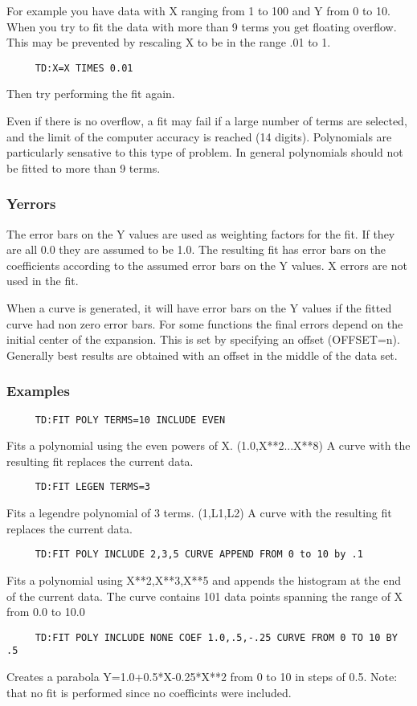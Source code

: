 For  example you have data with X ranging from 1 to 100 and Y from 0 to
10.  When you try to fit the data  with  more  than  9  terms  you  get
floating  overflow.   This may be prevented by rescaling X to be in the
range .01 to 1.  
\begin{verbatim}
     TD:X=X TIMES 0.01 
\end{verbatim}
Then try performing the fit again.  

Even if there is no overflow, a fit may fail if a large number of terms
are selected, and the limit of the computer  accuracy  is  reached  (14
digits).   Polynomials  are  particularly  sensative  to  this  type of
problem.  In general polynomials should not be fitted to  more  than  9
terms.  
\subsubsection{Yerrors     }
The  error  bars  on the Y values are used as weighting factors for the
fit.  If they are all 0.0 they are assumed to be  1.0.   The  resulting
fit  has  error bars on the coefficients according to the assumed error
bars on the Y values.  X errors are not used in the fit.  

When  a  curve is generated, it will have error bars on the Y values if
the fitted curve had non zero error bars.  For some functions the final
errors  depend  on the initial center of the expansion.  This is set by
specifying an offset (OFFSET=n).  Generally best results  are  obtained
with an offset in the middle of the data set.  
\subsubsection{Examples    }
\begin{verbatim}
     TD:FIT POLY TERMS=10 INCLUDE EVEN 
\end{verbatim}
Fits  a  polynomial  using  the  even powers of X.  (1.0,X**2...X**8) A
curve with the resulting fit replaces the current data.  
\begin{verbatim}
     TD:FIT LEGEN TERMS=3 
\end{verbatim}
Fits  a  legendre  polynomial  of  3 terms.  (1,L1,L2) A curve with the
resulting fit replaces the current data.  
\begin{verbatim}
     TD:FIT POLY INCLUDE 2,3,5 CURVE APPEND FROM 0 to 10 by .1 
\end{verbatim}
Fits a polynomial using X**2,X**3,X**5 and appends the histogram at the
end of the current data.  The curve contains 101 data  points  spanning
the range of X from 0.0 to 10.0 
\begin{verbatim}
     TD:FIT POLY INCLUDE NONE COEF 1.0,.5,-.25 CURVE FROM 0 TO 10 BY .5 
\end{verbatim}
Creates  a parabola Y=1.0+0.5*X-0.25*X**2 from 0 to 10 in steps of 0.5.
Note:  that no fit is performed since no coefficints were included.  
